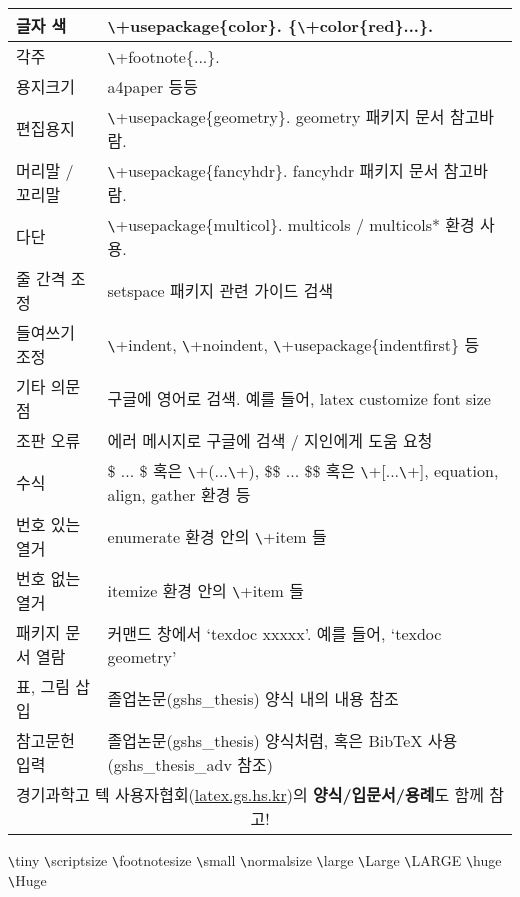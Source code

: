 \documentclass[11pt]{article}
\begin{document}
\begin{table}[h]
\begin{tabular}{|p{}|p{}|}
		\hline
		글자 색 & \verb+\+usepackage\{color\}. \{\verb+\+color\{red\}...\}. \\
		\hline
		각주 & \verb+\+footnote\{...\}.  \\
		\hline
		용지크기 & a4paper 등등 \\
		\hline
		편집용지 & \verb+\+usepackage\{geometry\}. geometry 패키지 문서 참고바람. \\
		\hline
		머리말 / 꼬리말 & \verb+\+usepackage\{fancyhdr\}. fancyhdr 패키지 문서 참고바람. \\
		\hline
		다단 & \verb+\+usepackage\{multicol\}. multicols / multicols* 환경 사용. \\
		\hline
		줄 간격 조정 & setspace 패키지 관련 가이드 검색 \\
		\hline
		들여쓰기 조정 & \verb+\+indent, \verb+\+noindent,  \verb+\+usepackage\{indentfirst\} 등 \\
		\hline
		기타 의문점 & 구글에 영어로 검색. 예를 들어, latex customize font size \\
		\hline
		조판 오류 & 에러 메시지로 구글에 검색 / 지인에게 도움 요청 \\
		\hline
		수식 & \$ ... \$ 혹은 \verb+\+(...\verb+\+), \$\$ ... \$\$ 혹은 \verb+\+[...\verb+\+], equation, align, gather 환경 등 \\
		\hline
		번호 있는 열거 & enumerate 환경 안의 \verb+\+item 들\\
		\hline
		번호 없는 열거 & itemize 환경 안의 \verb+\+item 들 \\
		\hline
		패키지 문서 열람 & 커맨드 창에서 `texdoc xxxxx'. 예를 들어, `texdoc geometry' \\
		\hline
		표, 그림 삽입 & 졸업논문(gshs\_thesis) 양식 내의 내용 참조 \\
		\hline
		참고문헌 입력 & 졸업논문(gshs\_thesis) 양식처럼, 혹은 BibTeX 사용(gshs\_thesis\_adv 참조) \\
		\hline
		\multicolumn{2}{|c|}{경기과학고 텍 사용자협회(\url{latex.gs.hs.kr})의 \textbf{양식/입문서/용례}도 함께 참고!} \\
		\hline
	\end{tabular}
\end{table}
{\tiny \verb+\+tiny} {\scriptsize \verb+\+scriptsize} {\footnotesize \verb+\+footnotesize} {\small \verb+\+small} {\normalsize \verb+\+normalsize} {\large \verb+\+large} {\Large \verb+\+Large} {\LARGE \verb+\+LARGE} {\huge \verb+\+huge} {\Huge \verb+\+Huge}
\end{document}

